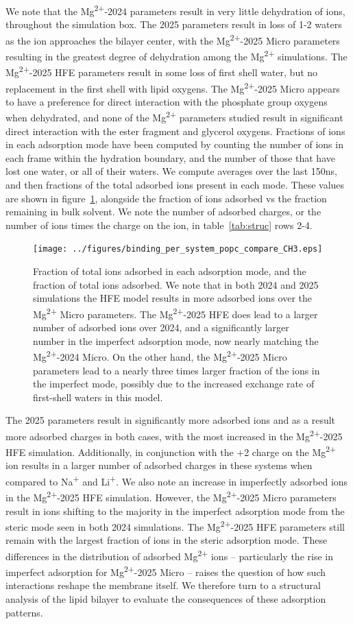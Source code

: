 \documentclass[12pt,openany,final]{book}
\newcommand{\na}{Na\textsuperscript{+}}
\newcommand{\li}{Li\textsuperscript{+}}
\newcommand{\mg}{Mg\textsuperscript{2+}}
\begin{document}
We note that the \mg{-2024} parameters result in very little dehydration of ions, throughout the simulation box. The 2025 parameters result in loss of 1-2 waters as the ion approaches the bilayer center, with the \mg{-2025} Micro parameters resulting in the greatest degree of dehydration among the \mg{} simulations.
The \mg{-2025} HFE parameters result in some loss of first shell water, but no replacement in the first shell with lipid oxygens.
The \mg{-2025} Micro appears to have a preference for direct interaction with the phosphate group oxygens when dehydrated, and none of the \mg{} parameters studied result in significant direct interaction with the ester fragment and glycerol oxygens.
Fractions of ions in each adsorption mode have been computed by counting the number of ions in each frame within the hydration boundary, and the number of those that have lost one water, or all of their waters. We compute averages over the last 150ns, and then
fractions of the total adsorbed ions present in each mode. These values are shown in figure~\ref{fig:adfrac}, alongside the fraction of ions adsorbed vs the fraction remaining in bulk solvent. We note the
number of adsorbed charges, or the number of ions times the charge on the ion, in table~\ref{tab:struc} rows 2-4.
\begin{figure}[H]
    \caption[Adsorption mode fractions]{Fraction of total ions adsorbed in each adsorption mode, and the fraction of total ions adsorbed. We note
        that in both 2024 and 2025 simulations the HFE model results in more adsorbed ions over the \mg{} Micro parameters.
    The \mg{-2025} HFE does lead to a larger number of adsorbed ions over 2024, and a significantly larger number in the imperfect
    adsorption mode, now nearly matching the \mg{-2024} Micro. On the other hand, the \mg{-2025} Micro parameters lead to a nearly three times
    larger fraction of the ions in the imperfect mode, possibly due to the increased exchange rate of first-shell waters in this
    model.}
    \label{fig:adfrac}
    \texttt{[image: ../figures/binding\_per\_system\_popc\_compare\_CH3.eps]}
\end{figure}
The 2025 parameters result in significantly more adsorbed ions and as a result more adsorbed charges in both cases, with the most increased in the \mg{-2025} HFE simulation.
Additionally,  in conjunction
with the +2 charge on the \mg{} ion results in a larger number of adsorbed charges in these systems when compared to \na{} and \li{}.
We also note an increase in imperfectly adsorbed ions in the \mg{-2025} HFE simulation. However, the \mg{-2025} Micro parameters result in ions shifting to the majority in the imperfect
adsorption mode from the steric mode seen in both 2024 simulations.
The \mg{-2025} HFE parameters still remain with the largest fraction of ions in the steric adsorption mode.
These differences in the distribution of adsorbed \mg{} ions -- particularly the rise in imperfect adsorption for \mg{-2025} Micro --
raises the question of how such interactions reshape the membrane itself. We therefore turn to a structural analysis of the lipid bilayer
to evaluate the consequences of these adsorption patterns.
\end{document}
